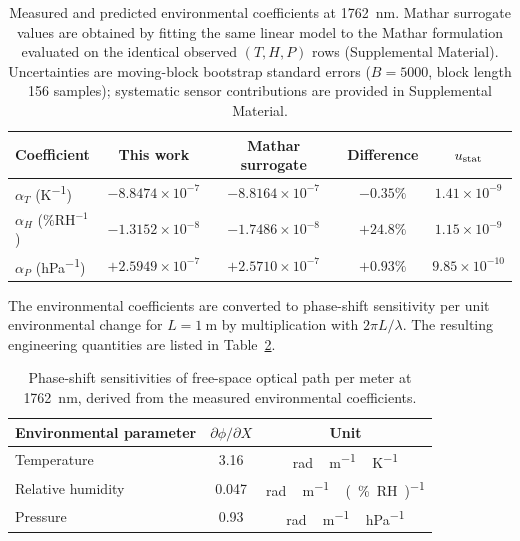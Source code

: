 \documentclass[aps,prapplied,reprint,groupedaddress,twocolumn,superscriptaddress,linenumbers]{revtex4-2}
\begin{document}
\begin{table}[htbp]
\centering
\caption{Measured and predicted environmental coefficients at
         \SI{1762}{\nano\meter}. Mathar surrogate values are obtained
         by fitting the same linear model to the Mathar formulation
         evaluated on the identical observed $(T,H,P)$ rows
         (Supplemental Material). Uncertainties are moving-block
         bootstrap standard errors ($B = 5000$, block length 156
         samples); systematic sensor contributions are provided in
         Supplemental Material.}
\label{tab:coefficients}
\begin{tabular}{lcccc}
\hline
Coefficient & This work & Mathar surrogate & Difference & $u_{\rm stat}$ \\
\hline
$\alpha_T$ (\si{K^{-1}})      & $-8.8474\times 10^{-7}$ & $-8.8164\times 10^{-7}$ & $-0.35\%$ & $1.41\times10^{-9}$ \\
$\alpha_H$ (\%RH$^{-1}$)      & $-1.3152\times 10^{-8}$ & $-1.7486\times 10^{-8}$ & $+24.8\%$ & $1.15\times10^{-9}$ \\
$\alpha_P$ (\si{hPa^{-1}})    & $+2.5949\times 10^{-7}$ & $+2.5710\times 10^{-7}$ & $+0.93\%$ & $9.85\times10^{-10}$ \\
\hline
\end{tabular}
\end{table}

The environmental coefficients are converted to phase-shift sensitivity per unit environmental change for $L = \SI{1}{\meter}$ by multiplication with $2\pi L / \lambda$. The resulting engineering quantities are listed in Table~\ref{tab:phase_shift}.

\begin{table}[htbp]
\centering
\caption{Phase-shift sensitivities of free-space optical path per meter
         at \SI{1762}{\nano\meter}, derived from the measured environmental
         coefficients.}
\label{tab:phase_shift}
\begin{tabular}{lcc}
\hline
Environmental parameter & $\partial\phi/\partial X$ & Unit \\
\hline
Temperature          & 3.16  & \si{rad\,m^{-1}\,K^{-1}} \\
Relative humidity    & 0.047 & \si{rad\,m^{-1}\,(\%RH)^{-1}} \\
Pressure             & 0.93  & \si{rad\,m^{-1}\,hPa^{-1}} \\
\hline
\end{tabular}
\end{table}
\end{document}
